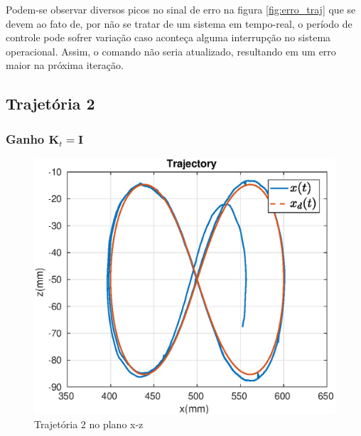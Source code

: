 Podem-se observar diversos picos no sinal de erro na figura \ref{fig:erro_traj} que se devem ao fato de, por não se tratar de um sistema em tempo-real, o período de controle pode sofrer variação caso aconteça alguma interrupção no sistema operacional. Assim, o comando não seria atualizado, resultando em um erro maior na próxima iteração.


\subsection{Trajetória 2}

\subsubsection{Ganho $\bm{K}_t = \bm{I}$}
\begin{figure}[H]
\centering
  \includegraphics[width=0.5\linewidth]{./img/traj_2_k1/traj.eps}
  \caption{Trajetória 2 no plano x-z}
  \label{fig:sub1}
\end{figure}%


